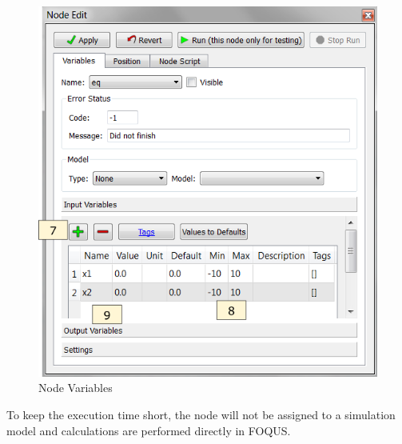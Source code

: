 \begin{figure}[H]
	\begin{center}
		\includegraphics[scale=0.55]{Chapt_surrogates/figs/nodeInput}
		\caption{Node Variables}
		\label{fig.tut.sur.nodeEdit.Input}
	\end{center}
\end{figure}
To keep the execution time short, the node will not be assigned to a simulation model and calculations are performed directly in FOQUS.  
